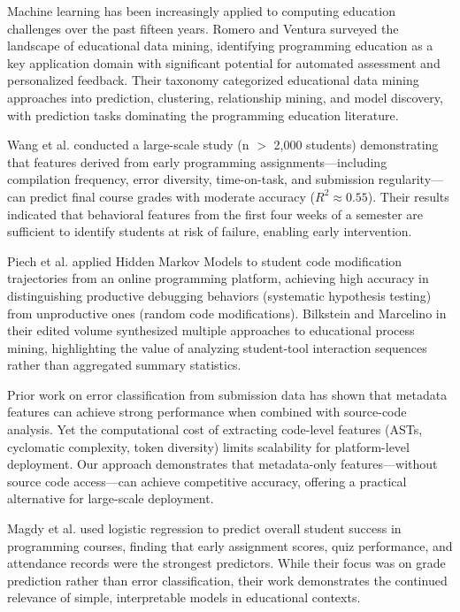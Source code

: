 \documentclass[10pt,letterpaper]{article}
\begin{document}
Machine learning has been increasingly applied to computing education
challenges over the past fifteen years. Romero and Ventura
\cite{romero2013data} surveyed the landscape of educational data mining,
identifying programming education as a key application domain with
significant potential for automated assessment and personalized feedback.
Their taxonomy categorized educational data mining approaches into prediction,
clustering, relationship mining, and model discovery, with prediction tasks
dominating the programming education literature.

Wang et al. \cite{wang2017learning} conducted a large-scale study (n $>$ 2,000
students) demonstrating that features derived from early programming
assignments---including compilation frequency, error diversity, time-on-task,
and submission regularity---can predict final course grades with moderate
accuracy ($R^2 \approx 0.55$). Their results indicated that behavioral
features from the first four weeks of a semester are sufficient to identify
students at risk of failure, enabling early intervention.

Piech et al. \cite{effenberger2021validity} applied Hidden Markov Models to student
code modification trajectories from an online programming platform, achieving
high accuracy in distinguishing productive debugging behaviors (systematic
hypothesis testing) from unproductive ones (random code modifications).
Bilkstein and Marcelino in their edited volume \cite{romero2013data}
synthesized multiple approaches to educational process mining, highlighting the
value of analyzing student-tool interaction sequences rather than aggregated
summary statistics.

Prior work on error classification from submission data has shown that
metadata features can achieve strong performance when combined with
source-code analysis. Yet the computational cost of extracting
code-level features (ASTs, cyclomatic complexity, token diversity)
limits scalability for platform-level deployment. Our approach demonstrates
that metadata-only features---without source code access---can achieve
competitive accuracy, offering a practical alternative for large-scale
deployment.

Magdy et al. \cite{alnahhas2020predicting} used logistic regression to predict
overall student success in programming courses, finding that early assignment
scores, quiz performance, and attendance records were the strongest predictors.
While their focus was on grade prediction rather than error classification,
their work demonstrates the continued relevance of simple, interpretable models
in educational contexts.
\end{document}
